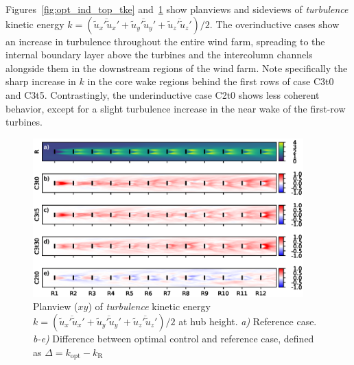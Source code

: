 		Figures~\ref{fig:opt_ind_top_tke} and~\ref{fig:opt_ind_side_tke} show planviews and sideviews of \emph{turbulence} kinetic energy $k = (\overline{\widetilde{u}_x'\widetilde{u}_x'} + \overline{\widetilde{u}_y'\widetilde{u}_y'} + \overline{\widetilde{u}_z'\widetilde{u}_z'})/2$. The overinductive cases show an increase in turbulence throughout the entire wind farm, spreading to the internal boundary layer above the turbines and the intercolumn channels alongside them in the downstream regions of the wind farm. Note specifically the sharp increase in $k$ in the core wake regions behind the first rows of case C3t0 and C3t5. Contrastingly, the underinductive case C2t0 shows less coherent behavior, except for a slight turbulence increase in the near wake of the first-row turbines.
	
		\begin{figure}[ht]
			\centering
			\includegraphics[width=0.93\textwidth]{chapters/optimal_induction_control/topview_tke.eps}
			\caption[Planview ($xy$) of \emph{turbulence} kinetic energy $k = (\overline{\widetilde{u}_x'\widetilde{u}_x'} + \overline{\widetilde{u}_y'\widetilde{u}_y'} + \overline{\widetilde{u}_z'\widetilde{u}_z'})/2$ at hub height.]{Planview ($xy$) of \emph{turbulence} kinetic energy $k = (\overline{\widetilde{u}_x'\widetilde{u}_x'} + \overline{\widetilde{u}_y'\widetilde{u}_y'} + \overline{\widetilde{u}_z'\widetilde{u}_z'})/2$ at hub height. \emph{a) } Reference case. \emph{b-e)} Difference between optimal control and reference case, defined as $\Delta = k_{\text{opt}} - k_{\text{R}}$  \label{fig:opt_ind_side_tke}}
		\end{figure}
	
